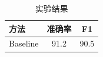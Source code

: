 \documentclass[fontset=fandol]{ctexart}
\begin{document}
\begin{table}[htbp]
  \centering
  \caption{实验结果}
  \begin{tabular}{lcc}
    \toprule
    方法 & 准确率 & F1 \\
    \midrule
    Baseline & 91.2 & 90.5 \\
    \bottomrule
  \end{tabular}
\end{table}
\end{document}
